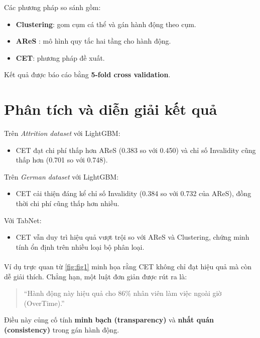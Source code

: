 Các phương pháp so sánh gồm:
\begin{itemize}
    \item \textbf{Clustering}: gom cụm cá thể và gán hành động theo cụm.
    \item \textbf{AReS} \parencite{rawal2020ares}: mô hình quy tắc hai tầng cho hành động.
    \item \textbf{CET}: phương pháp đề xuất.
\end{itemize}

Kết quả được báo cáo bằng \textbf{5-fold cross validation}.

\section{Phân tích và diễn giải kết quả}
Trên \textit{Attrition dataset} với LightGBM:
\begin{itemize}
    \item CET đạt chi phí thấp hơn AReS (0.383 so với 0.450) và chỉ số Invalidity cũng thấp hơn (0.701 so với 0.748).
\end{itemize}

Trên \textit{German dataset} với LightGBM:
\begin{itemize}
    \item CET cải thiện đáng kể chỉ số Invalidity (0.384 so với 0.732 của AReS), đồng thời chi phí cũng thấp hơn nhiều.
\end{itemize}

Với TabNet:
\begin{itemize}
    \item CET vẫn duy trì hiệu quả vượt trội so với AReS và Clustering, chứng minh tính ổn định trên nhiều loại bộ phân loại.
\end{itemize}

\paragraph{} Ví dụ trực quan từ \autoref{fig:fig1} minh họa rằng CET không chỉ đạt hiệu quả mà còn dễ giải thích. Chẳng hạn, một luật đơn giản được rút ra là:
\begin{quote}
    “Hành động này hiệu quả cho 86\% nhân viên làm việc ngoài giờ (OverTime).”
\end{quote}

Điều này củng cố tính \textbf{minh bạch (transparency)} và \textbf{nhất quán (consistency)} trong gán hành động.

